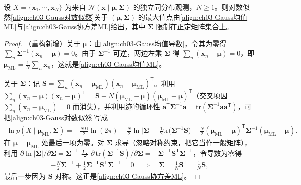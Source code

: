 \documentclass[../../main.tex]{subfiles}
\begin{document}
\begin{proposition}\label{proposition:ch03-Gauss最大似然}
设 $X=\{\boldsymbol{x}_1,\cdots,\boldsymbol{x}_N\}$ 为来自 $\mathcal{N}(\boldsymbol{x}\mid\boldsymbol{\mu},\boldsymbol{\Sigma})$ 的独立同分布观测，$N\geqslant1$。则对数似然\eqref{align:ch03-Gauss对数似然}关于 $(\boldsymbol{\mu},\boldsymbol{\Sigma})$ 的最大值点由\eqref{align:ch03-Gauss均值ML}与\eqref{align:ch03-Gauss协方差ML}给出，其中 $\boldsymbol{\Sigma}$ 限制在正定矩阵集合上。
\end{proposition}
\begin{proof}
（重构新增）关于 $\boldsymbol{\mu}$：由\eqref{align:ch03-Gauss均值导数}，令其为零得 $\sum_n\boldsymbol{\Sigma}^{-1}(\boldsymbol{x}_n-\boldsymbol{\mu})=0$。由于 $\boldsymbol{\Sigma}^{-1}$ 可逆，两边左乘 $\boldsymbol{\Sigma}$ 得 $\sum_n(\boldsymbol{x}_n-\boldsymbol{\mu})=0$，即 $\boldsymbol{\mu}_{\mathrm{ML}}=\frac{1}{N}\sum_n\boldsymbol{x}_n$，这就是\eqref{align:ch03-Gauss均值ML}。

关于 $\boldsymbol{\Sigma}$：记 $\boldsymbol{S}=\sum_n(\boldsymbol{x}_n-\boldsymbol{\mu}_{\mathrm{ML}})(\boldsymbol{x}_n-\boldsymbol{\mu}_{\mathrm{ML}})^{\mathsf{T}}$。利用 $\sum_n(\boldsymbol{x}_n-\boldsymbol{\mu})(\boldsymbol{x}_n-\boldsymbol{\mu})^{\mathsf{T}}=\boldsymbol{S}+N(\boldsymbol{\mu}_{\mathrm{ML}}-\boldsymbol{\mu})(\boldsymbol{\mu}_{\mathrm{ML}}-\boldsymbol{\mu})^{\mathsf{T}}$（交叉项因 $\sum_n(\boldsymbol{x}_n-\boldsymbol{\mu}_{\mathrm{ML}})=0$ 而消失），并利用迹的循环性 $\boldsymbol{a}^{\mathsf{T}}\boldsymbol{\Sigma}^{-1}\boldsymbol{a}=\mathrm{tr}(\boldsymbol{\Sigma}^{-1}\boldsymbol{a}\boldsymbol{a}^{\mathsf{T}})$，可把\eqref{align:ch03-Gauss对数似然}写成
\begin{align*}
\ln p(X\mid\boldsymbol{\mu}_{\mathrm{ML}},\boldsymbol{\Sigma})=-\frac{ND}{2}\ln(2\pi)-\frac{N}{2}\ln\lvert\boldsymbol{\Sigma}\rvert-\frac{1}{2}\mathrm{tr}\bigl(\boldsymbol{\Sigma}^{-1}\boldsymbol{S}\bigr)-\frac{N}{2}(\boldsymbol{\mu}_{\mathrm{ML}}-\boldsymbol{\mu})^{\mathsf{T}}\boldsymbol{\Sigma}^{-1}(\boldsymbol{\mu}_{\mathrm{ML}}-\boldsymbol{\mu}).
\end{align*}
在 $\boldsymbol{\mu}=\boldsymbol{\mu}_{\mathrm{ML}}$ 处最后一项为零。对 $\boldsymbol{\Sigma}$ 求导（忽略对称约束，把它当作一般矩阵），利用 $\partial\ln\lvert\boldsymbol{\Sigma}\rvert/\partial\boldsymbol{\Sigma}=\boldsymbol{\Sigma}^{-\mathsf{T}}$ 与 $\partial\,\mathrm{tr}(\boldsymbol{\Sigma}^{-1}\boldsymbol{S})/\partial\boldsymbol{\Sigma}=-\boldsymbol{\Sigma}^{-\mathsf{T}}\boldsymbol{S}^{\mathsf{T}}\boldsymbol{\Sigma}^{-\mathsf{T}}$，令导数为零得
\begin{align*}
-\frac{N}{2}\boldsymbol{\Sigma}^{-\mathsf{T}}+\frac{1}{2}\boldsymbol{\Sigma}^{-\mathsf{T}}\boldsymbol{S}^{\mathsf{T}}\boldsymbol{\Sigma}^{-\mathsf{T}}=0\quad\Longrightarrow\quad\boldsymbol{\Sigma}=\frac{1}{N}\boldsymbol{S}^{\mathsf{T}}=\frac{1}{N}\boldsymbol{S},
\end{align*}
最后一步因为 $\boldsymbol{S}$ 对称。这正是\eqref{align:ch03-Gauss协方差ML}。


\end{proof}
\end{document}
